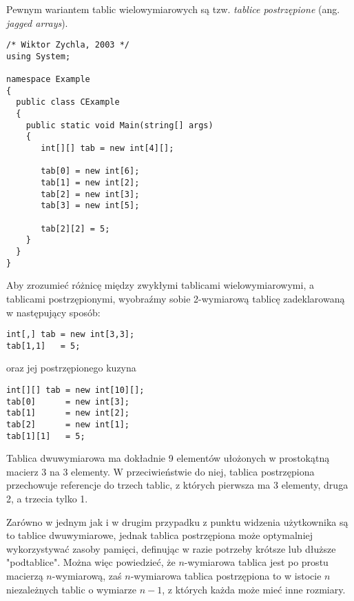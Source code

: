 Pewnym wariantem tablic wielowymiarowych są tzw. {\em tablice postrzępione} (ang. {\em jagged arrays}).

\begin{scriptsize}
\begin{verbatim}
/* Wiktor Zychla, 2003 */
using System;

namespace Example
{
  public class CExample 
  {
    public static void Main(string[] args)
    {
       int[][] tab = new int[4][];

       tab[0] = new int[6];
       tab[1] = new int[2];
       tab[2] = new int[3];
       tab[3] = new int[5];

       tab[2][2] = 5;       
    }
  }
}
\end{verbatim}
\end{scriptsize}

Aby zrozumieć różnicę między zwykłymi tablicami wielowymiarowymi, a tablicami postrzępionymi, wyobraźmy
sobie 2-wymiarową tablicę zadeklarowaną w następujący sposób:

\begin{scriptsize}
\begin{verbatim}
int[,] tab = new int[3,3];
tab[1,1]   = 5;
\end{verbatim}
\end{scriptsize}

oraz jej postrzępionego kuzyna

\begin{scriptsize}
\begin{verbatim}
int[][] tab = new int[10][];
tab[0]      = new int[3];
tab[1]      = new int[2];
tab[2]      = new int[1];
tab[1][1]   = 5;
\end{verbatim}
\end{scriptsize}

Tablica dwuwymiarowa ma dokładnie 9 elementów ułożonych w prostokątną macierz 3 na 3 elementy. W przeciwieństwie
do niej, tablica postrzępiona przechowuje referencje do trzech tablic, z których pierwsza ma 3 elementy,
druga 2, a trzecia tylko 1. 

Zarówno w jednym jak i w drugim przypadku z punktu widzenia użytkownika są to tablice dwuwymiarowe, jednak
tablica postrzępiona może optymalniej wykorzystywać zasoby pamięci, definując w razie potrzeby krótsze lub 
dłuższe "podtablice". Można więc powiedzieć, że $n$-wymiarowa tablica jest po prostu macierzą $n$-wymiarową,
zaś $n$-wymiarowa tablica postrzępiona to w istocie $n$ niezależnych tablic o wymiarze $n-1$, z których
każda może mieć inne rozmiary.

